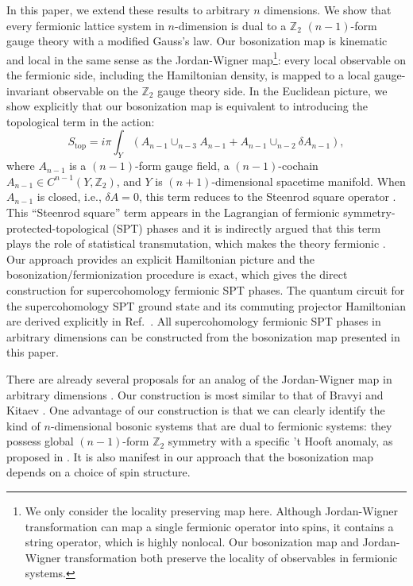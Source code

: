\documentclass[12pt]{article}
\newcommand{\ZZ}{{\mathbb Z}}
\begin{document}
In this paper, we extend these results to arbitrary $n$ dimensions. We show that every fermionic lattice system in $n$-dimension is dual to a $\ZZ_2$ $(n-1)$-form gauge theory with a modified Gauss's law. Our bosonization map is kinematic and local in the same sense as the Jordan-Wigner map\footnote{We only consider the locality preserving map here. Although Jordan-Wigner transformation can map a single fermionic operator into spins, it contains a string operator, which is highly nonlocal. Our bosonization map and Jordan-Wigner transformation both preserve the locality of observables in fermionic systems.}: every local observable on the fermionic side, including the Hamiltonian density, is mapped to a local gauge-invariant observable on the $\ZZ_2$ gauge theory side. In the Euclidean picture, we show explicitly that our bosonization map is equivalent to introducing the topological term in the action:
\begin{equation}
     S_{\text{top}} = i \pi \int_Y (A_{n-1} \cup_{n-3} A_{n-1} + A_{n-1} \cup_{n-2} \delta A_{n-1}),
\end{equation}
where $A_{n-1}$ is a $(n-1)$-form gauge field, a $(n-1)$-cochain $A_{n-1} \in C^{n-1}(Y,\ZZ_2)$, and $Y$ is $(n+1)$-dimensional spacetime manifold. When $A_{n-1}$ is closed, i.e., $\delta A = 0$, this term reduces to the Steenrod square operator \cite{S47}. This ``Steenrod square'' term appears in the Lagrangian of fermionic symmetry-protected-topological (SPT) phases \cite{LZW18} and it is indirectly argued that this term plays the role of statistical transmutation, which makes the theory fermionic \cite{KT17,W17}. Our approach provides an explicit Hamiltonian picture and the bosonization/fermionization procedure is exact, which gives the direct construction for supercohomology fermionic SPT phases. The quantum circuit for the supercohomology SPT ground state and its commuting projector Hamiltonian are derived explicitly in Ref.~\cite{CET20}. All supercohomology fermionic SPT phases in arbitrary dimensions can be constructed from the bosonization map presented in this paper.



There are already several proposals for an analog of the Jordan-Wigner map in arbitrary dimensions \cite{BK02,B05,VC05,B19}. Our construction is most similar to that of Bravyi and Kitaev \cite{BK02}. One advantage of our construction is that we can clearly identify the kind of $n$-dimensional bosonic systems that are dual to fermionic systems: they possess global $(n-1)$-form $\ZZ_2$ symmetry with a specific 't Hooft anomaly, as proposed in \cite{GK16}. It is also manifest in our approach that the bosonization map depends on a choice of spin structure.
\end{document}
